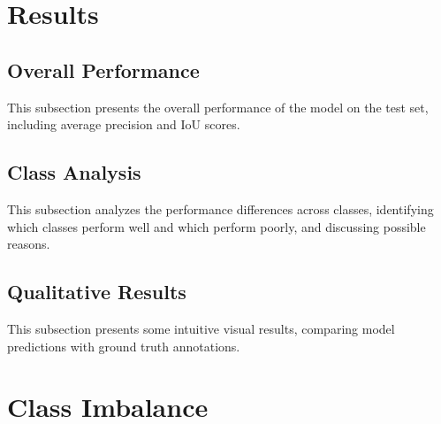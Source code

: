 \documentclass[conference]{IEEEtran}
\begin{document}
\section{Results}
\subsection{Overall Performance}
This subsection presents the overall performance of the model on the test set, including average precision and IoU scores.

\subsection{Class Analysis}
This subsection analyzes the performance differences across classes, identifying which classes perform well and which perform poorly, and discussing possible reasons.

\subsection{Qualitative Results}
This subsection presents some intuitive visual results, comparing model predictions with ground truth annotations.

\section{Class Imbalance}


\end{document}
